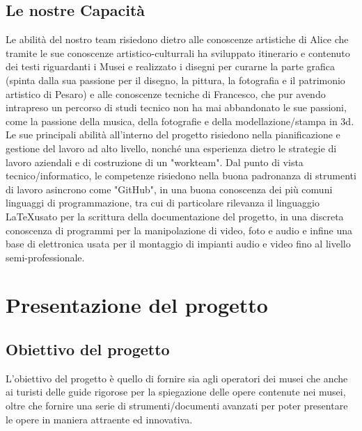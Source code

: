 \documentclass[hidelinks,12pt,a4paper]{article}
\begin{document}
\begin{flushleft}
				\subsection{Le nostre Capacità}
				Le abilità del nostro team risiedono dietro alle conoscenze artistiche di Alice
				che tramite le sue conoscenze artistico-culturrali ha sviluppato itinerario e contenuto dei testi riguardanti i Musei e realizzato i disegni per curarne la parte grafica (spinta dalla sua passione per il disegno, la pittura, la fotografia e il patrimonio artistico di Pesaro) e alle conoscenze tecniche di Francesco, che pur avendo intrapreso un percorso di studi tecnico non ha mai abbandonato le sue passioni, come la passione della musica, della fotografie e della modellazione/stampa in 3d. Le sue principali abilità all'interno del progetto risiedono nella pianificazione e gestione del lavoro ad alto livello, nonché una esperienza dietro le strategie di lavoro aziendali e di costruzione di un "workteam". Dal punto di vista tecnico/informatico, le competenze risiedono nella buona padronanza di strumenti di lavoro asincrono come "GitHub", in una buona conoscenza dei più comuni linguaggi di programmazione, tra cui di particolare rilevanza il linguaggio \LaTeX usato per la scrittura della documentazione del progetto, in una discreta conoscenza di programmi per la manipolazione di video, foto e audio e infine una base di elettronica usata per il montaggio di impianti audio e video fino al livello semi-professionale.
			
			\section{Presentazione del progetto}
				\subsection{Obiettivo del progetto}
				L'obiettivo del progetto è quello di fornire sia agli operatori dei musei che anche ai turisti delle guide rigorose per la spiegazione delle opere contenute nei musei, oltre che fornire una serie di strumenti/documenti avanzati per poter presentare le opere in maniera attraente ed innovativa.
				

\end{flushleft}
\end{document}

